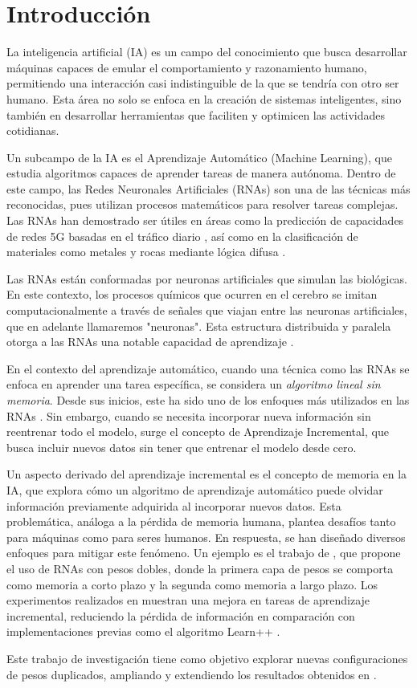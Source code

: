 \section{Introducción}

La inteligencia artificial (IA) es un campo del conocimiento que busca desarrollar máquinas capaces de emular el comportamiento y razonamiento humano, permitiendo una interacción casi indistinguible de la que se tendría con otro ser humano. Esta área no solo se enfoca en la creación de sistemas inteligentes, sino también en desarrollar herramientas que faciliten y optimicen las actividades cotidianas.\

Un subcampo de la IA es el Aprendizaje Automático (Machine Learning), que estudia algoritmos capaces de aprender tareas de manera autónoma. Dentro de este campo, las Redes Neuronales Artificiales (RNAs) son una de las técnicas más reconocidas, pues utilizan procesos matemáticos para resolver tareas complejas. Las RNAs han demostrado ser útiles en áreas como la predicción de capacidades de redes 5G basadas en el tráfico diario \cite{zhao2022}, así como en la clasificación de materiales como metales y rocas mediante lógica difusa \cite{salazar2013}.\

Las RNAs están conformadas por neuronas artificiales que simulan las biológicas. En este contexto, los procesos químicos que ocurren en el cerebro se imitan computacionalmente a través de señales que viajan entre las neuronas artificiales, que en adelante llamaremos "neuronas". Esta estructura distribuida y paralela otorga a las RNAs una notable capacidad de aprendizaje \cite{liu2015}.\

En el contexto del aprendizaje automático, cuando una técnica como las RNAs se enfoca en aprender una tarea específica, se considera un \textit{algoritmo lineal sin memoria}. Desde sus inicios, este ha sido uno de los enfoques más utilizados en las RNAs \cite{GiraudCarrier2000}. Sin embargo, cuando se necesita incorporar nueva información sin reentrenar todo el modelo, surge el concepto de Aprendizaje Incremental, que busca incluir nuevos datos sin tener que entrenar el modelo desde cero.\

Un aspecto derivado del aprendizaje incremental es el concepto de memoria en la IA, que explora cómo un algoritmo de aprendizaje automático puede olvidar información previamente adquirida al incorporar nuevos datos. Esta problemática, análoga a la pérdida de memoria humana, plantea desafíos tanto para máquinas como para seres humanos. En respuesta, se han diseñado diversos enfoques para mitigar este fenómeno. Un ejemplo es el trabajo de \cite{bullinaria2009}, que propone el uso de RNAs con pesos dobles, donde la primera capa de pesos se comporta como memoria a corto plazo y la segunda como memoria a largo plazo. Los experimentos realizados en \cite{bullinaria2009} muestran una mejora en tareas de aprendizaje incremental, reduciendo la pérdida de información en comparación con implementaciones previas como el algoritmo Learn++ \cite{li2008, Elwell2011}.\

Este trabajo de investigación tiene como objetivo explorar nuevas configuraciones de pesos duplicados, ampliando y extendiendo los resultados obtenidos en \cite{bullinaria2009}.







